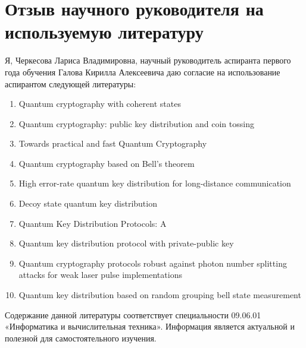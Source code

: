 \section*{Отзыв научного руководителя на используемую литературу}
Я, Черкесова Лариса Владимировна, научный руководитель аспиранта первого года обучения Галова Кирилла Алексеевича даю согласие на использование аспирантом следующей литературы:
\begin{enumerate}
	\item Quantum cryptography with coherent states
	\item Quantum cryptography: public key distribution and coin tossing
	\item Towards practical and fast Quantum Cryptography
	\item Quantum cryptography based on Bell's theorem
	\item High error-rate quantum key distribution for long-distance communication
	\item Decoy state quantum key distribution
	\item Quantum Key Distribution Protocols: A \review
	\item Quantum key distribution protocol with private-public key
	\item Quantum cryptography protocols robust against photon number splitting attacks for weak laser pulse implementations
	\item Quantum key distribution based on random grouping bell state measurement
\end{enumerate}
Содержание данной литературы соответствует специальности 09.06.01 «Информатика и вычислительная техника». Информация является актуальной и полезной для самостоятельного изучения.\\
\bigskip




